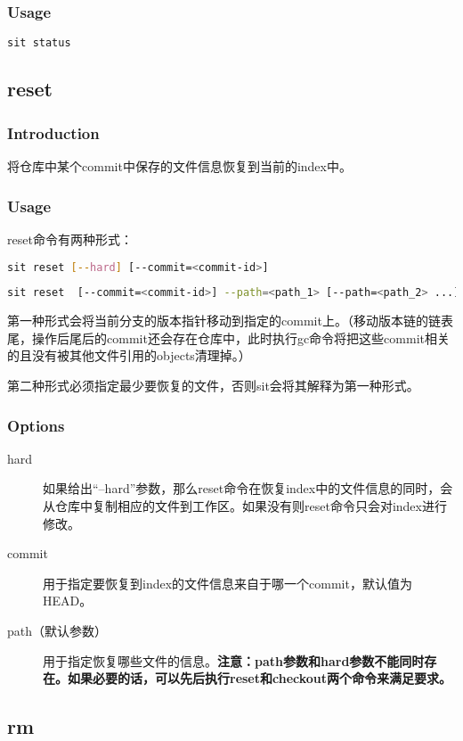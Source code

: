 \subsubsection*{Usage}
\begin{lstlisting}[language=sh]
sit status
\end{lstlisting}

\subsection{reset}
\subsubsection*{Introduction}
将仓库中某个commit中保存的文件信息恢复到当前的index中。
\subsubsection*{Usage}
reset命令有两种形式：
\begin{lstlisting}[language=sh]
sit reset [--hard] [--commit=<commit-id>]
\end{lstlisting}
\begin{lstlisting}[language=sh]
sit reset  [--commit=<commit-id>] --path=<path_1> [--path=<path_2> ...]
\end{lstlisting}

第一种形式会将当前分支的版本指针移动到指定的commit上。（移动版本链的链表尾，操作后尾后的commit还会存在仓库中，此时执行gc命令将把这些commit相关的且没有被其他文件引用的objects清理掉。）

第二种形式必须指定最少要恢复的文件，否则sit会将其解释为第一种形式。
\subsubsection*{Options}
\begin{description}
	\item[\YaHeiMono hard] 如果给出``--hard''参数，那么reset命令在恢复index中的文件信息的同时，会从仓库中复制相应的文件到工作区。如果没有则reset命令只会对index进行修改。
	\item[\YaHeiMono commit] 用于指定要恢复到index的文件信息来自于哪一个commit，默认值为HEAD。
	\item[\YaHeiMono path（默认参数）] 用于指定恢复哪些文件的信息。\textbf{注意：path参数和hard参数不能同时存在。如果必要的话，可以先后执行reset和checkout两个命令来满足要求。}
\end{description}

\subsection{rm}
